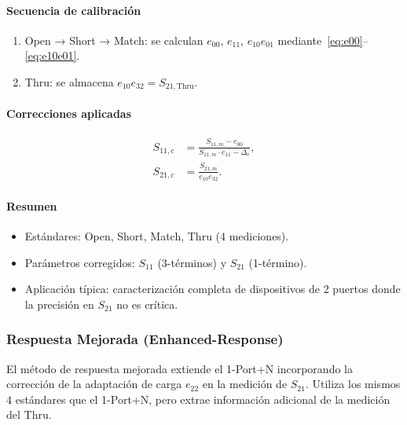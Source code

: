 \paragraph{Secuencia de calibración}

\begin{enumerate}
    \item Open → Short → Match: se calculan $e_{00}$, $e_{11}$, $e_{10}e_{01}$
          mediante~\eqref{eq:e00}--\eqref{eq:e10e01}.
    \item Thru: se almacena $e_{10}e_{32} = S_{21,\text{Thru}}$.
\end{enumerate}

\paragraph{Correcciones aplicadas}

\begin{align}
    S_{11,c} &= \frac{S_{11,m} - e_{00}}{S_{11,m}\cdot e_{11} - \Delta_e},
    \label{eq:1portn_s11} \\[4pt]
    S_{21,c} &= \frac{S_{21,m}}{e_{10}e_{32}}.
    \label{eq:1portn_s21}
\end{align}

\paragraph{Resumen}

\begin{itemize}
    \item Estándares: Open, Short, Match, Thru (4 mediciones).
    \item Parámetros corregidos: $S_{11}$ (3-términos) y $S_{21}$ (1-término).
    \item Aplicación típica: caracterización completa de dispositivos de 2 puertos
          donde la precisión en $S_{21}$ no es crítica.
\end{itemize}

\subsubsection{Respuesta Mejorada (Enhanced-Response)}
\label{sec:enhanced}

El método de respuesta mejorada extiende el 1-Port+N incorporando la
corrección de la adaptación de carga $e_{22}$ en la medición de $S_{21}$.
Utiliza los mismos 4 estándares que el 1-Port+N, pero extrae información
adicional de la medición del Thru.

